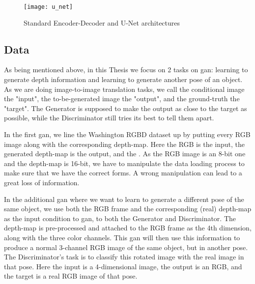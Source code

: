 \begin{figure}[h]
	\centering
	\texttt{[image: u\_net]}
	\caption{Standard Encoder-Decoder and U-Net architectures}
	\label{fig:u_net}
\end{figure}


\subsection{Data}
As being mentioned above, in this Thesis we focus on 2 tasks on \acrshort{gan}: learning
to generate depth information and learning to generate another pose of an object. As we
are doing image-to-image translation tasks, we call the conditional image the "input", the
to-be-generated image the "output", and the ground-truth the "target". The Generator is
supposed to make the output as close to the target as possible, while the Discriminator
still tries its best to tell them apart.

In the first \acrshort{gan}, we line the Washington RGBD dataset up by putting every RGB
image along with the corresponding depth-map. Here the RGB is the input, the generated
depth-map is the output, and the . As the RGB image is an 8-bit one and the depth-map is
16-bit, we have to manipulate the data loading process to make sure that we have the
correct forms. A wrong manipulation can lead to a great loss of information.

In the additional \acrshort{gan} where we want to learn to generate a different pose of
the same object, we use both the RGB frame and the corresponding (real) depth-map as the
input condition to \acrshort{gan}, to both the Generator and Discriminator. The depth-map
is pre-processed and attached to the RGB frame as the 4th dimension, along with the three
color channels. This \acrshort{gan} will then use this information to produce a normal
3-channel RGB image of the same object, but in another pose. The Discriminator's task is
to classify this rotated image with the real image in that pose. Here the input is a
4-dimensional image, the output is an RGB, and the target is a real RGB image of that
pose.

